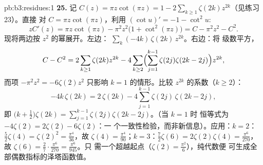 \begin{solution}{pb:b3:residues:1}
\textbf{25.} 记 $C(z) = \pi z\cot(\pi z) = 1 -
2\sum_{k\geq1}\zeta(2k)z^{2k}$（见练习 23）。直接
对 $C = \pi z\cot(\pi z)$，利用 $(\cot u)'
= -1 - \cot^2u$:
\[
zC'(z) = \pi z\cot(\pi z) - \pi^2z^2\bigl(1 +
\cot^2(\pi z)\bigr) = C - \pi^2z^2 - C^2 .
\]
现将两边按 $z^2$ 的幂展开。左边：
$\sum_k(-4k)\,\zeta(2k)\,z^{2k}$。右边：将
级数平方，
\[
C - C^2 = 2\sum_{k\geq1}\zeta(2k)z^{2k}
- 4\sum_{k\geq2}\Bigl(\sum_{j=1}^{k-1}\zeta(2j)
\zeta(2k-2j)\Bigr)z^{2k},
\]
而项 $-\pi^2z^2 = -6\zeta(2)z^2$ 只影响 $k =
1$ 的情形。比较 $z^{2k}$ 的系数（$k \geq 2$）：
\[
-4k\,\zeta(2k) = 2\,\zeta(2k) -
4\sum_{j=1}^{k-1}\zeta(2j)\,\zeta(2k-2j),
\]
即 $\bigl(k + \frac12\bigr)\zeta(2k) =
\sum_{j=1}^{k-1}\zeta(2j)\zeta(2k-2j)$。（当 $k = 1$ 时
恒等式为 $-4\zeta(2) = 2\zeta(2) - 6\zeta(2)$：一
个一致性检验，而非新信息）。应用：$k =
2$：$\frac52\zeta(4) = \zeta(2)^2 = \frac{\pi^4}{36}$，故
$\zeta(4) = \frac{\pi^4}{90}$；$k = 3$：$\frac72\zeta(6) =
2\zeta(2)\zeta(4) = \frac{\pi^6}{270}$，故 $\zeta(6) =
\frac{2}{7}\cdot\frac{\pi^6}{270} = \frac{\pi^6}{945}$。只
需一个超越起点（$\zeta(2) = \frac{\pi^2}6$），纯代数便
可生成全部偶数指标的泽塔函数值。
\end{solution}
